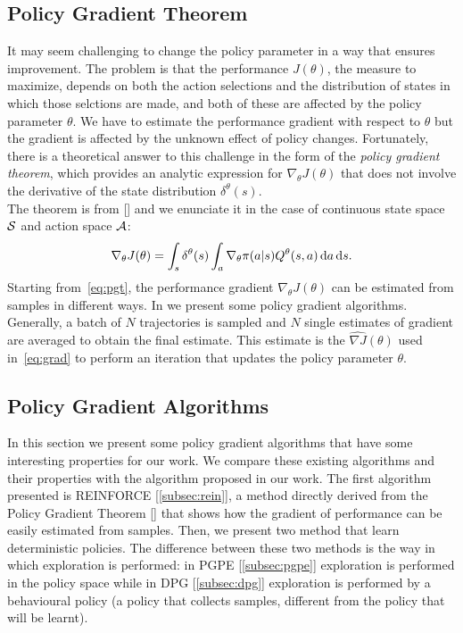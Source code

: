 \subsection{Policy Gradient Theorem} \label{subsec:pgt}
It may seem challenging to change the policy parameter in a way that ensures improvement. The problem is that the performance $J(\theta)$, \ie the measure to maximize, depends on both the action selections and the distribution of states in which those selctions are made, and both of these are affected by the policy parameter $\theta$. We have to estimate the performance gradient with respect to $\theta$ but the gradient is affected by the unknown effect of policy changes. Fortunately, there is a theoretical answer to this challenge in the form of the \emph{policy gradient theorem}, which provides an analytic expression for $\nabla_{\theta}J(\theta)$ that does not involve the derivative of the state distribution $\delta^{\theta}(s)$.\\
\newline
The theorem is from [\citet{Sutton1999PolicyGM}] and we enunciate it in the case of continuous state space $\mathcal{S}$ and action space $\mathcal{A}$:
\begin{align}
\nabla_{\theta}J(\theta) = \int_s \delta^{\theta}(s) \int_a \nabla_{\theta} \pi(a|s) Q^{\theta}(s,a) \,\mathrm{d} a \,\mathrm{d} s. \label{eq:pgt}
\end{align}
Starting from~\eqref{eq:pgt}, the performance gradient $\nabla_{\theta}J(\theta)$ can be estimated from samples in different ways. In  we present some policy gradient algorithms. Generally, a batch of $N$ trajectories is sampled and $N$ single estimates of gradient are averaged to obtain the final estimate. This estimate is the $\widehat{\nabla J}(\theta)$ used in~\eqref{eq:grad} to perform an iteration that updates the policy parameter $\theta$.

\subsection{Policy Gradient Algorithms} \label{subsec:alg}
In this section we present some policy gradient algorithms that have some interesting properties for our work. We compare these existing algorithms and their properties with the algorithm proposed in our work. The first algorithm presented is REINFORCE [\ref{subsec:rein}], a method directly derived from the Policy Gradient Theorem [] that shows how the gradient of performance can be easily estimated from samples. Then, we present two method that learn deterministic policies. The difference between these two methods is the way in which exploration is performed: in \acf{PGPE} [\ref{subsec:pgpe}] exploration is performed in the policy space while in \acf{DPG} [\ref{subsec:dpg}] exploration is performed by a behavioural policy (\ie a policy that collects samples, different from the policy that will be learnt).

